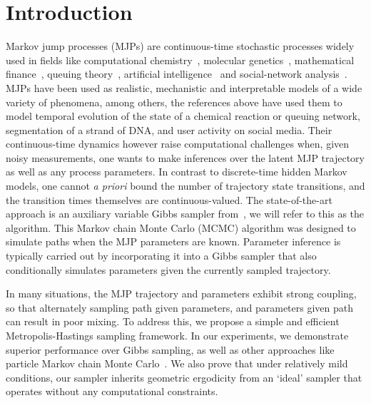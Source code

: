 
\section{Introduction}
\label{sec:intro}
Markov jump processes (MJPs) are continuous-time stochastic processes widely used in fields like computational chemistry~\citep{gillespie97}, molecular genetics~\citep{FearnSher2006}, mathematical finance~\citep{Elliott06}, queuing theory~\citep{Breuer2003}, artificial intelligence~\citep{XuShe10} and social-network analysis~\citep{pan2016markov}. 
MJPs have been used as realistic, mechanistic and interpretable models of a wide variety of phenomena, among others, the references above have used them to model temporal evolution of the state of a chemical reaction or queuing network, segmentation of a strand of DNA, and user activity on social media.
Their continuous-time dynamics however raise computational challenges when, given noisy measurements, one wants to make inferences 
over the latent MJP trajectory as well as any process parameters. 
In contrast to {discrete-time} hidden Markov models, one cannot 
{\em a priori} bound the number of trajectory state transitions, and the transition times themselves are continuous-valued. 
The state-of-the-art approach is an auxiliary variable Gibbs sampler from~\cite{RaoTeh13}, we will refer to this as the {\algname} algorithm. 
This Markov chain Monte Carlo (MCMC) algorithm was designed to simulate paths when the MJP parameters are known. 
Parameter inference is typically carried out by incorporating it into a Gibbs sampler that also conditionally simulates parameters given the currently sampled trajectory. 

In many situations, the MJP trajectory and parameters exhibit strong coupling, so that alternately sampling path given parameters, and parameters given path can result in poor mixing.  
To address this, we propose a simple and efficient Metropolis-Hastings sampling framework. 
In our experiments, we demonstrate superior performance over Gibbs sampling, as well as other approaches like particle Markov chain Monte Carlo~\citep{Andrieu10}. 
We also prove that under relatively mild conditions, our sampler inherits geometric ergodicity from an `ideal' sampler that operates without any computational constraints.

